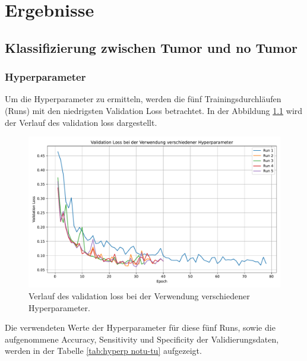 \chapter{Ergebnisse}
\section{Klassifizierung zwischen Tumor und no Tumor}
\subsection{Hyperparameter}
Um die Hyperparameter zu ermitteln, werden die fünf Trainingsdurchläufen (Runs) mit den niedrigsten Validation Loss betrachtet.
In der Abbildung \ref{fig:val_loss notu-tu} wird der Verlauf des validation loss dargestellt.
\begin{figure}[H]
  \centering
  \includegraphics[scale=0.4]{plots/Val_loss_noTu_Tu.pdf}
  \caption{Verlauf des validation loss bei der Verwendung verschiedener Hyperparameter.}
  \label{fig:val_loss notu-tu}
\end{figure}
\vspace{-2em}
Die verwendeten Werte der Hyperparameter für diese fünf Runs, sowie die aufgenommene Accuracy, Sensitivity und Specificity der Validierungsdaten,
werden in der Tabelle \ref{tab:hyperp notu-tu} aufgezeigt.
